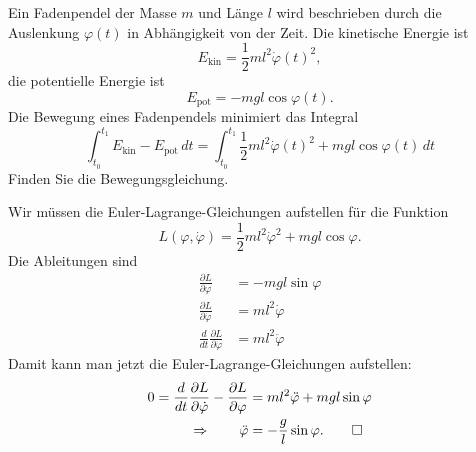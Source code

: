 Ein Fadenpendel der Masse $m$ und Länge $l$ wird beschrieben durch
die Auslenkung $\varphi(t)$ in Abhängigkeit von der Zeit. 
Die kinetische Energie ist 
\[
E_{\text{kin}}
=
\frac12ml^2\dot\varphi(t)^2,
\]
die potentielle Energie ist
\[
E_{\text{pot}}
=
-mgl\cos\varphi(t).
\]
Die Bewegung eines Fadenpendels minimiert das Integral
\[
\int_{t_0}^{t_1}
E_{\text{kin}}-E_{\text{pot}}
\,dt
=
\int_{t_0}^{t_1}
\frac12ml^2\dot\varphi(t)^2
+
mgl\cos\varphi(t)
\,dt
\]
Finden Sie die Bewegungsgleichung.

\begin{loesung}
Wir müssen die Euler-Lagrange-Gleichungen aufstellen für die
Funktion
\[
L(\varphi, \dot\varphi)
=
\frac12ml^2\dot\varphi^2
+
mgl\cos\varphi.
\]
Die Ableitungen sind
\begin{align*}
\frac{\partial L}{\partial\varphi}
&=
-mgl\sin\varphi
\\
\frac{\partial L}{\partial\dot\varphi}
&=
ml^2\dot\varphi
\\
\frac{d}{dt}
\frac{\partial L}{\partial\dot\varphi}
&=
ml^2\ddot\varphi
\end{align*}
Damit kann man jetzt die Euler-Lagrange-Gleichungen aufstellen:
\begin{align*}
0=
\frac{d}{dt}
\frac{\partial L}{\partial\dot\varphi}
-
\frac{\partial L}{\partial\varphi}
&=
ml^2\ddot\varphi
+
mgl\sin\varphi
\\
\Rightarrow\qquad
\ddot\varphi
&=
-\frac{g}{l}\sin\varphi.
\qedhere
\end{align*}
\end{loesung}


